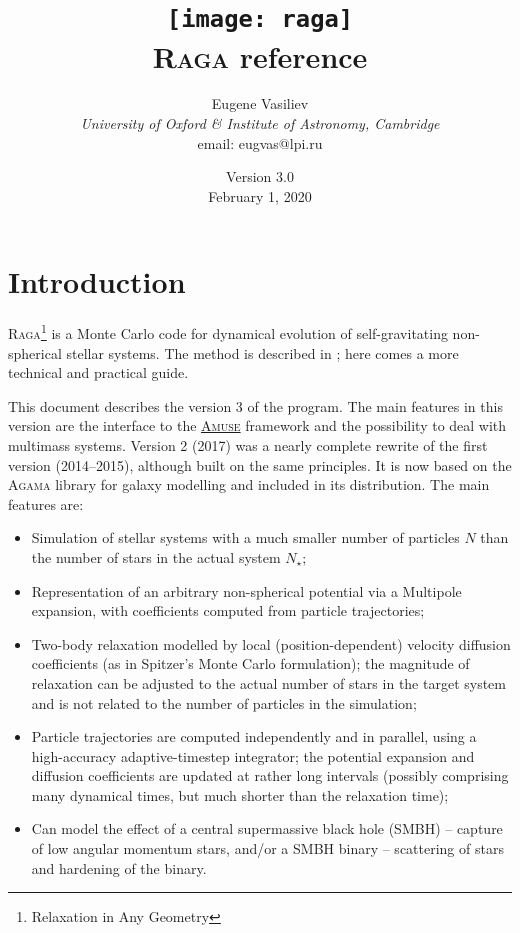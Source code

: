 \documentclass[12pt]{article}
\newcommand{\Raga}{\textsc{Raga}\xspace}
\newcommand{\Agama}{\textsc{Agama}\xspace}
\newcommand{\Amuse}{\textsc{Amuse}\xspace}
\begin{document}
\title{
\texttt{[image: raga]} \protect\\[1cm]
\protect\Raga reference}
\author{Eugene Vasiliev\\
\normalsize\textit{University of Oxford \& Institute of Astronomy, Cambridge}\\
\normalsize\textrm{email: eugvas@lpi.ru} }

\date{Version 3.0\\ February 1, 2020}

\maketitle
\tableofcontents

\section{Introduction}
\Raga\footnote{Relaxation in Any Geometry}
is a Monte Carlo code for dynamical evolution of self-gravitating non-spherical stellar systems.
The method is described in \cite{Vasiliev2015}; here comes a more technical and practical guide.

This document describes the version 3 of the program. The main features in this version are the interface to the \href{http://amusecode.org}{\Amuse} framework \cite{AMUSE} and the possibility to deal with multimass systems.
Version 2 (2017) was a nearly complete rewrite of the first version (2014--2015), although built on the same principles. It is now based on the \Agama library for galaxy modelling \cite{Vasiliev2019} and included in its distribution. The main features are:
\begin{itemize}
\item Simulation of stellar systems with a much smaller number of particles $N$ than the number of stars in the actual system $N_\star$;
\item Representation of an arbitrary non-spherical potential via a Multipole expansion, with coefficients computed from particle trajectories;
\item Two-body relaxation modelled by local (position-dependent) velocity diffusion coefficients (as in Spitzer's Monte Carlo formulation); the magnitude of relaxation can be adjusted to the actual number of stars in the target system and is not related to the number of particles in the simulation;
\item Particle trajectories are computed independently and in parallel, using a high-accuracy adaptive-timestep integrator; the potential expansion and diffusion coefficients are updated at rather long intervals (possibly comprising many dynamical times, but much shorter than the relaxation time);
\item Can model the effect of a central supermassive black hole (SMBH) -- capture of low angular momentum stars, and/or a SMBH binary -- scattering of stars and hardening of the binary.
\end{itemize}
\end{document}
